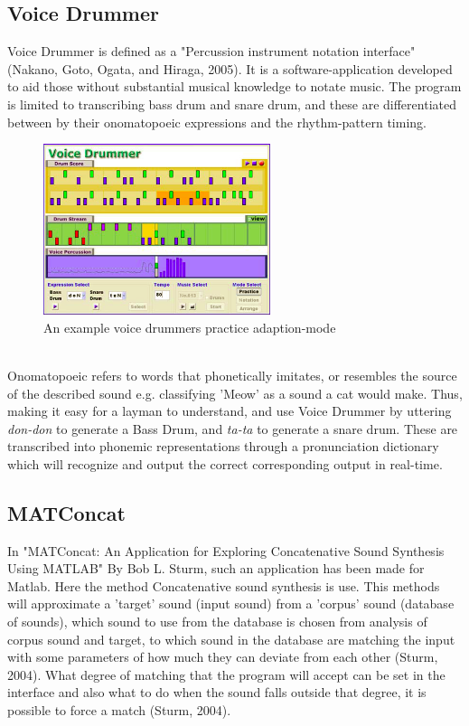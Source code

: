 \subsection{ Voice Drummer }
Voice Drummer is defined as a "Percussion instrument notation interface" (Nakano, Goto, Ogata, and Hiraga, 2005). It is a software-application developed to aid those without substantial musical knowledge to notate music. The program is limited to transcribing bass drum and snare drum, and these are differentiated between by their onomatopoeic expressions and the rhythm-pattern timing.
\\
\begin{figure}[h]
	\begin{center}
		\includegraphics[height=5cm]{fig/VoiceDrummer.png}
		\caption{An example voice drummers practice adaption-mode}
		\label{VoiceDrummer}
	\end{center}
\end{figure}
\\
Onomatopoeic refers to words that phonetically imitates, or resembles the source of the described sound e.g. classifying 'Meow' as a sound a cat would make. Thus, making it easy for a layman to understand, and use Voice Drummer by uttering \textit{don-don} to generate a Bass Drum, and \textit{ta-ta} to generate a snare drum. These are transcribed into phonemic representations through a pronunciation dictionary which will recognize and
 output the correct corresponding output in real-time.

\subsection{ MATConcat }
In "MATConcat: An Application for Exploring Concatenative Sound Synthesis Using MATLAB"  By Bob L. Sturm, such an application has been made for Matlab. Here the method Concatenative sound synthesis is use. This methods will approximate a 'target' sound (input sound) from a 'corpus' sound (database of sounds), which sound to use from the database is chosen from analysis of corpus sound and target, to which sound in the database are matching the input with some parameters of how much they can deviate from each other (Sturm, 2004). What degree of matching that the program will accept can be set in the interface and also what to do when the sound falls outside that degree, it is possible to force a match (Sturm, 2004).

